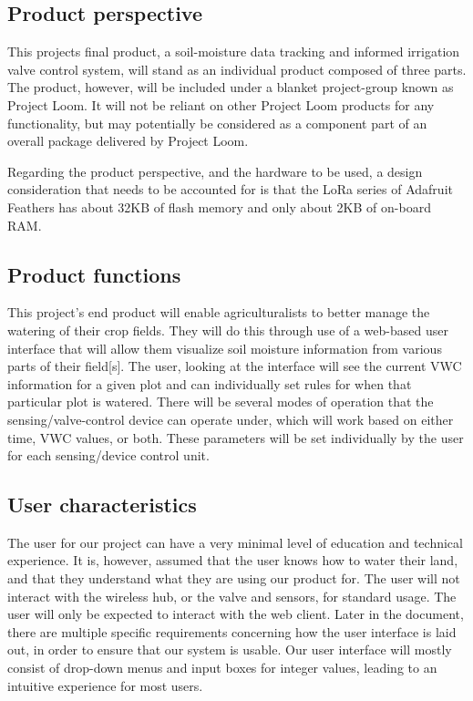 \documentclass[onecolumn, draftclsnofoot,10pt, compsoc]{IEEEtran}
\begin{document}
	\subsection{Product perspective}
	This projects final product, a soil-moisture data tracking and informed irrigation valve control system, will stand as an individual product composed of three parts.
	The product, however, will be included under a blanket project-group known as Project Loom.
	It will not be reliant on other Project Loom products for any functionality, but may potentially be considered as a component part of an overall package delivered by Project Loom.
	
	Regarding the product perspective, and the hardware to be used, a design consideration that needs to be accounted for is that the LoRa series of Adafruit Feathers has about 32KB of flash memory and only about 2KB of on-board RAM.\cite{pakronics_2016}  
	
	
	\subsection{Product functions}
	This project's end product will enable agriculturalists to better manage the watering of their crop fields.
	They will do this through use of a web-based user interface that will allow them visualize soil moisture information from various parts of their field[s].
	The user, looking at the interface will see the current VWC information for a given plot and can individually set rules for when that particular plot is watered.
	There will be several modes of operation that the sensing/valve-control device can operate under, which will work based on either time, VWC values, or both.
	These parameters will be set individually by the user for each sensing/device control unit.
	
	\subsection{User characteristics}
	The user for our project can have a very minimal level of education and technical experience.
	It is, however, assumed that the user knows how to water their land, and that they understand what they are using our product for. 
	The user will not interact with the wireless hub, or the valve and sensors, for standard usage. 
	The user will only be expected to interact with the web client. 
	Later in the document, there are multiple specific requirements concerning how the user interface is laid out, in order to ensure that our system is usable. 
	Our user interface will mostly consist of drop-down menus and input boxes for integer values, leading to an intuitive experience for most users. 
\end{document}
